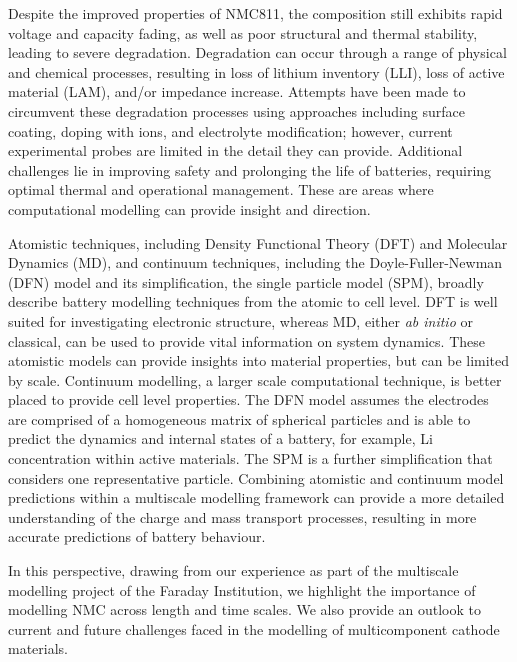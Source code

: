 \documentclass[journal=jacsat,manuscript=article]{achemso}
\begin{document}
Despite the improved properties of NMC811, the composition still exhibits rapid voltage and capacity fading, as well as poor structural and thermal stability,\cite{noh2013comparison,Li-aenm-2019,Jerng-ACS-AMI-2020} leading to severe degradation.\cite{Zhang-acs.chemmater-2019,Feng-2019,Xia2018,De-AdMat-2019,Li_Nat-Comm-2017,Manthiram-NatComm-2020}
Degradation can occur through a range of physical and chemical processes, resulting in loss of lithium inventory (LLI), loss of active material (LAM), and/or impedance increase.\cite{vetter2005ageing} 
Attempts have been made to circumvent these degradation processes using approaches including surface coating, doping with ions, and electrolyte modification;\cite{maleki2019controllable,Liu-JSSE-2020} however, current experimental probes are limited in the detail they can provide. 
Additional challenges lie in improving safety and prolonging the life of batteries, requiring optimal thermal and operational management. 
These are areas where computational modelling can provide insight and direction.

Atomistic techniques, including Density Functional Theory (DFT) and Molecular Dynamics (MD), and continuum techniques, including the Doyle-Fuller-Newman (DFN) model and its simplification, the single particle model (SPM),\cite{Newman1975porous,Doyle1993DFN} broadly describe battery modelling techniques from the atomic to cell level.\cite{Howey_2020} 
DFT is well suited for investigating electronic structure, whereas MD, either \textit{ab initio} or classical, can be used to provide vital information on system dynamics.
These atomistic models can provide insights into material properties, but can be limited by scale. 
Continuum modelling, a larger scale computational technique, is better placed to provide cell level properties.
The DFN model assumes the electrodes are comprised of a homogeneous matrix of spherical particles and is able to predict the dynamics and internal states of a battery, for example, Li concentration within active materials.
The SPM is a further simplification that considers one representative particle.
Combining atomistic and continuum model predictions within a multiscale modelling framework can provide a more detailed understanding of the charge and mass transport processes, resulting in more accurate predictions of battery behaviour.

In this perspective, drawing from our experience as part of the multiscale modelling project of the Faraday Institution, we highlight the importance of modelling NMC across length and time scales.
We also provide an outlook to current and future challenges faced in the modelling of multicomponent cathode materials.
\end{document}
